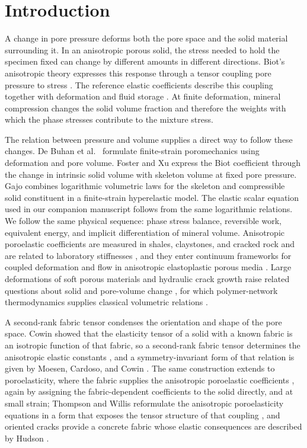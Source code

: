 \documentclass[11pt]{article}
\begin{document}
\section{Introduction}
\label{sec:introduction}

A change in pore pressure deforms both the pore space and the solid material
surrounding it. In an anisotropic porous solid, the stress needed to hold
the specimen fixed can change by different amounts in different directions.
Biot's anisotropic theory expresses this response through a tensor coupling
pore pressure to stress \citep{biot1955anisotropic}. The reference elastic
coefficients describe this coupling together with deformation and fluid
storage \citep{biotwillis1957,thompsonwillis1991}. At finite deformation,
mineral compression changes the solid volume fraction and therefore the
weights with which the phase stresses contribute to the mixture stress.

The relation between pressure and volume supplies a direct way to follow
these changes. De Buhan et al.\ \citep{debuhan1998} formulate finite-strain
poromechanics using deformation and pore volume. Foster and Xu
\citep{fosterxu2025} express the Biot coefficient through the change in
intrinsic solid volume with skeleton volume at fixed pore pressure.
Gajo \citep{gajo2010} combines logarithmic volumetric laws for the skeleton
and compressible solid constituent in a finite-strain hyperelastic model.
The elastic scalar equation used in our companion manuscript
\citep{foster2026poroplastic} follows from the same logarithmic relations.
We follow the same physical sequence: phase stress balance, reversible
work, equivalent energy, and implicit differentiation of mineral volume.
Anisotropic poroelastic coefficients are measured in shales, claystones, and
cracked rock and are related to laboratory stiffnesses
\citep{cheng1997,wong2017,braun2021,sviridov2017,makhnenkolabuz2016}, and they
enter continuum frameworks for coupled deformation and flow in anisotropic
elastoplastic porous media \citep{zhaoborja2020}. Large deformations of soft
porous materials and hydraulic crack growth raise related questions about solid
and pore-volume change \citep{macminnetal2016,chaubazantsu2016}, for which
polymer-network thermodynamics supplies classical volumetric relations
\citep{flory1961}.

A second-rank fabric tensor condenses the orientation and shape of the
pore space. Cowin showed that the elasticity tensor of a solid with a
known fabric is an isotropic function of that fabric, so a second-rank
fabric tensor determines the anisotropic elastic constants
\citep{cowin1985fabric,turnercowin1987}, and a symmetry-invariant form of
that relation is given by Moesen, Cardoso, and Cowin
\citep{moesencardosocowin2012}. The same construction extends to
poroelasticity, where the fabric supplies the anisotropic poroelastic
coefficients \citep{cowin2004fabric,cowinmehrabadi2007}, again by assigning
the fabric-dependent coefficients to the solid directly, and at small strain;
Thompson and
Willis reformulate the anisotropic poroelasticity equations in a form that
exposes the tensor structure of that coupling
\citep{thompsonwillis1991}, and oriented cracks provide a concrete fabric
whose elastic consequences are described by Hudson \citep{hudson1981}.
\end{document}
